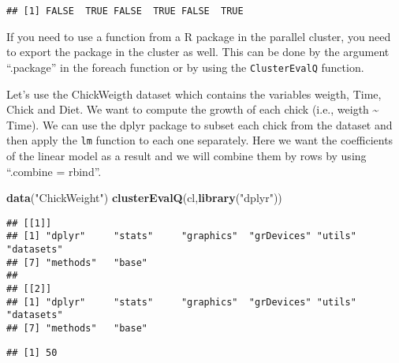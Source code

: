 \documentclass[]{article}
\newenvironment{Shaded}{\begin{snugshade}}{\end{snugshade}}
\newcommand{\KeywordTok}[1]{\textcolor[rgb]{0.13,0.29,0.53}{\textbf{#1}}}
\newcommand{\StringTok}[1]{\textcolor[rgb]{0.31,0.60,0.02}{#1}}
\newcommand{\OperatorTok}[1]{\textcolor[rgb]{0.81,0.36,0.00}{\textbf{#1}}}
\newcommand{\NormalTok}[1]{#1}
\begin{document}
\begin{verbatim}
## [1] FALSE  TRUE FALSE  TRUE FALSE  TRUE
\end{verbatim}

If you need to use a function from a R package in the parallel cluster,
you need to export the package in the cluster as well. This can be done
by the argument ``.package'' in the foreach function or by using the
\texttt{ClusterEvalQ} function.

Let's use the ChickWeigth dataset which contains the variables weigth,
Time, Chick and Diet. We want to compute the growth of each chick (i.e.,
weigth \textasciitilde{} Time). We can use the dplyr package to subset
each chick from the dataset and then apply the \texttt{lm} function to
each one separately. Here we want the coefficients of the linear model
as a result and we will combine them by rows by using ``.combine =
rbind''.

\begin{Shaded}
\begin{Highlighting}[]
\KeywordTok{data}\NormalTok{(}\StringTok{"ChickWeight"}\NormalTok{)}
\KeywordTok{clusterEvalQ}\NormalTok{(cl,}\KeywordTok{library}\NormalTok{(}\StringTok{"dplyr"}\NormalTok{))}
\end{Highlighting}
\end{Shaded}

\begin{verbatim}
## [[1]]
## [1] "dplyr"     "stats"     "graphics"  "grDevices" "utils"     "datasets" 
## [7] "methods"   "base"     
## 
## [[2]]
## [1] "dplyr"     "stats"     "graphics"  "grDevices" "utils"     "datasets" 
## [7] "methods"   "base"
\end{verbatim}

\begin{Shaded}
\end{Shaded}

\begin{verbatim}
## [1] 50
\end{verbatim}
\end{document}
